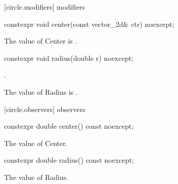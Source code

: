  [circle.modifiers]{ modifiers}

\begin{itemdecl}
constexpr void center(const vector_2d& ctr) noexcept;
\end{itemdecl}

\begin{itemdescr}
\pnum
\effects
The value of Center is .
\end{itemdescr}

\begin{itemdecl}
constexpr void radius(double r) noexcept;
\end{itemdecl}
\begin{itemdescr}
\preconditions
{}.

\pnum
\effects
The value of Radius is .
\end{itemdescr}

 [circle.observers]{ observers}

\begin{itemdecl}
constexpr double center() const noexcept;
\end{itemdecl}
\begin{itemdescr}
\pnum
\returns
The value of Center.
\end{itemdescr}

\begin{itemdecl}
constexpr double radius() const noexcept;
\end{itemdecl}
\begin{itemdescr}
\pnum
\returns
The value of Radius.
\end{itemdescr}
